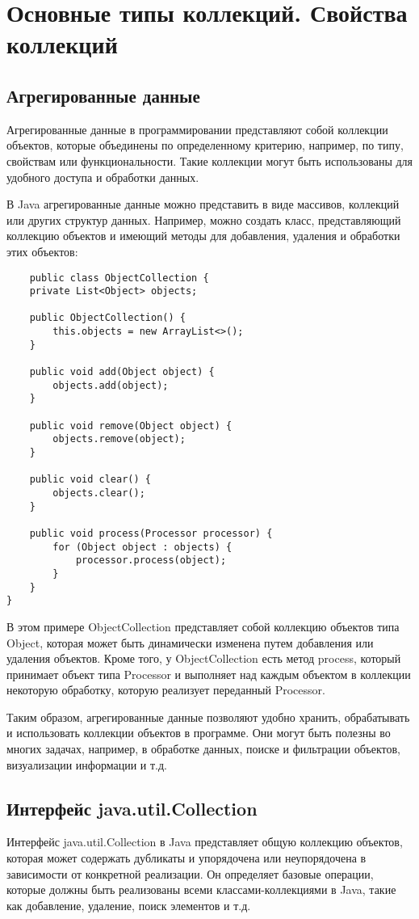 \newpage
\chapter{Основные типы коллекций. Свойства коллекций}
\section{Агрегированные данные}
Агрегированные данные в программировании представляют собой коллекции объектов, которые объединены по определенному критерию, например, по типу, свойствам или функциональности. Такие коллекции могут быть использованы для удобного доступа и обработки данных.

В Java агрегированные данные можно представить в виде массивов, коллекций или других структур данных. Например, можно создать класс, представляющий коллекцию объектов и имеющий методы для добавления, удаления и обработки этих объектов:
\begin{lstlisting}
    public class ObjectCollection {
    private List<Object> objects;

    public ObjectCollection() {
        this.objects = new ArrayList<>();
    }

    public void add(Object object) {
        objects.add(object);
    }

    public void remove(Object object) {
        objects.remove(object);
    }

    public void clear() {
        objects.clear();
    }

    public void process(Processor processor) {
        for (Object object : objects) {
            processor.process(object);
        }
    }
}
\end{lstlisting}
В этом примере ObjectCollection представляет собой коллекцию объектов типа Object, которая может быть динамически изменена путем добавления или удаления объектов. Кроме того, у ObjectCollection есть метод process, который принимает объект типа Processor и выполняет над каждым объектом в коллекции некоторую обработку, которую реализует переданный Processor.

Таким образом, агрегированные данные позволяют удобно хранить, обрабатывать и использовать коллекции объектов в программе. Они могут быть полезны во многих задачах, например, в обработке данных, поиске и фильтрации объектов, визуализации информации и т.д.
\section{Интерфейс java.util.Collection}
Интерфейс java.util.Collection в Java представляет общую коллекцию объектов, которая может содержать дубликаты и упорядочена или неупорядочена в зависимости от конкретной реализации. Он определяет базовые операции, которые должны быть реализованы всеми классами-коллекциями в Java, такие как добавление, удаление, поиск элементов и т.д.

